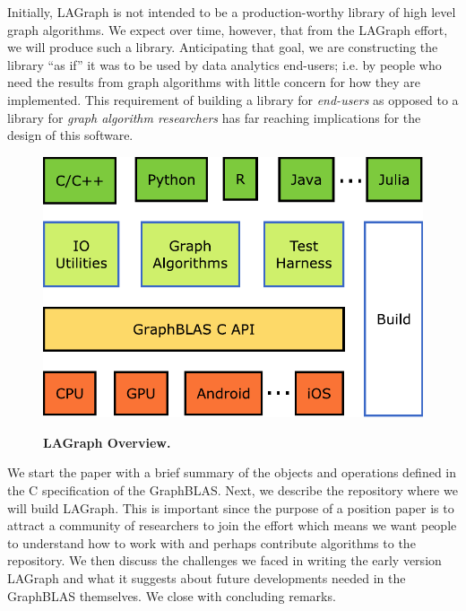 Initially, LAGraph is not intended to be a production-worthy library of 
high level graph algorithms.  We expect over time, however, that from the LAGraph 
effort, we will produce such a library.  Anticipating that goal, we are constructing
the library ``as if'' it was to be used by data analytics end-users; i.e. by people
who need the results from graph algorithms with little concern for how they are
implemented.  This requirement of building a library for \emph{end-users} as opposed to 
a library for \emph{graph algorithm researchers} has far reaching implications for the 
design of this software.

\begin{figure}[t]
	\includegraphics[width=\linewidth]{fig/lagraph}
	\label{fig:overview}
	\caption
	{\textbf{LAGraph Overview.}}
\end{figure}

We start the paper with a brief summary of the objects and operations defined in
the C specification of the GraphBLAS.  Next, we describe
the repository where we will build LAGraph.  This is important since the
purpose of a position paper is to attract a community of researchers to join the effort
which means we want people to understand how to work with and perhaps contribute 
algorithms to the repository.  We then discuss the challenges we faced in writing the 
early version LAGraph and what it suggests about future developments needed in the
GraphBLAS themselves. We close with concluding remarks.














